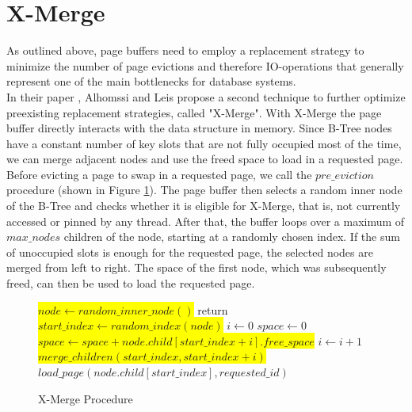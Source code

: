 \documentclass[acmlarge,nonacm,dvipsnames]{acmart}
\begin{document}
\section{X-Merge}
As outlined above, page buffers need to employ a replacement strategy to minimize the number of page evictions and therefore IO-operations that generally represent one of the main bottlenecks for database systems.\\
In their paper \cite{contention_space_management}, Alhomssi and Leis propose a second technique to further optimize preexisting replacement strategies, called "X-Merge". With X-Merge the page buffer directly interacts with the data structure in memory. Since B-Tree nodes have a constant number of key slots that are not fully occupied most of the time, we can merge adjacent nodes and use the freed space to load in a requested page.\\
Before evicting a page to swap in a requested page, we call the $pre\_eviction$ procedure (shown in Figure \ref{fig:x_merge}). The page buffer then selects a random inner node of the B-Tree and checks whether it is eligible for X-Merge, that is, not currently accessed or pinned by any thread. After that, the buffer loops over a maximum of $max\_nodes$ children of the node, starting at a randomly chosen index. If the sum of unoccupied slots is enough for the requested page, the selected nodes are merged from left to right. The space of the first node, which was subsequently freed, can then be used to load the requested page.
\begin{figure}
\begin{minipage}{0.625\textwidth}
\begin{algorithmic}[1]
	\State \colorbox{yellow}{$node\leftarrow random\_inner\_node()$}
	\State return
	\EndIf
	\State \colorbox{yellow}{$start\_index\leftarrow random\_index(node)$}
	\State $i\leftarrow 0$
	\State $space\leftarrow 0$
	\State \colorbox{yellow}{$space\leftarrow space + node.child[start\_index + i].free\_space$}
	\State $i\leftarrow i + 1$
	\EndWhile
	\State \colorbox{yellow}{$merge\_children(start\_index, start\_index + i)$}
	\State $load\_page(node.child[start\_index], requested\_id)$
	\EndIf
	\EndProcedure
\end{algorithmic} 
\end{minipage}
\caption{X-Merge Procedure}
\label{fig:x_merge}
\end{figure}
\end{document}

